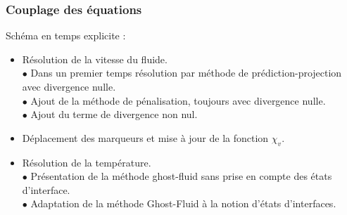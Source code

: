 \documentclass{beamer}
\begin{document}
\begin{frame}
    \frametitle{Couplage des équations}
        \footnotesize
        \begin{ceablock}{Schéma en temps explicite :}
        \begin{itemize}
            \item Résolution de la vitesse du fluide.\\
				\color{cea_texte!70}$\bullet$ Dans un premier temps résolution par méthode de prédiction-projection avec divergence nulle.\\
				$\bullet$ Ajout de la méthode de pénalisation, toujours avec divergence nulle.\\
				$\bullet$ Ajout du terme de divergence non nul.\color{cea_texte}
			
            \item Déplacement des marqueurs et mise à jour de la fonction $\chi_v$.
            \item Résolution de la température.\\
            	\color{cea_texte!70}$\bullet$ Présentation de la méthode ghost-fluid sans prise en compte des états d'interface.\\
            	$\bullet$ Adaptation de la méthode Ghost-Fluid à la notion d'états d'interfaces.           
        \end{itemize}
        \end{ceablock}
    
\end{frame}
\end{document}
